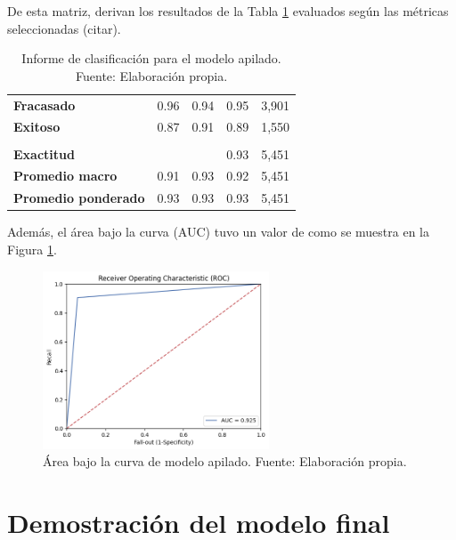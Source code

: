 De esta matriz, derivan los resultados de la Tabla \ref{5:table4} evaluados según las métricas seleccionadas (citar).

\begin{table}[h!]
	\centering
	\small
	\begin{tabular}{ |m{4.5cm}|m{2.5cm}|m{2.5cm}|m{2.5cm}|m{2.5cm}|  }
		\hline
		\rowcolor{bluejean}
		\Centering \color{white}{Valor}& \Centering \color{white}{Precisión}& \Centering \color{white}{Sensibilidad}& \Centering \color{white}{Puntaje F1}& \Centering \color{white}{Muestras}\\
		\hline
		\textbf{Fracasado} & 0.96 & 0.94 & 0.95 & 3,901 \\
		\hline
		\textbf{Exitoso} & 0.87 & 0.91 & 0.89 & 1,550 \\
		\hline
		\rowcolor{turq}
		\multicolumn{5}{c}{ } \\
		\hline
		\textbf{Exactitud} &  &	 & 0.93 & 5,451 \\
		\hline
		\textbf{Promedio macro} & 0.91 & 0.93 & 0.92 & 5,451 \\
		\hline
		\textbf{Promedio ponderado} & 0.93 & 0.93 & 0.93 & 5,451 \\
		\hline
	\end{tabular}
	\caption{Informe de clasificación para el modelo apilado. Fuente: Elaboración propia.}
	\label{5:table4}
\end{table}

Además, el área bajo la curva (AUC) tuvo un valor de como se muestra en la Figura \ref{5:fig16}.

\begin{figure}[!ht]
	\begin{center}
		\includegraphics[width=0.60\textwidth]{4/figures/stacked_auc.png}
		\caption{Área bajo la curva de modelo apilado. Fuente: Elaboración propia.}
		\label{5:fig16}
	\end{center}
\end{figure}

\section{Demostración del modelo final}